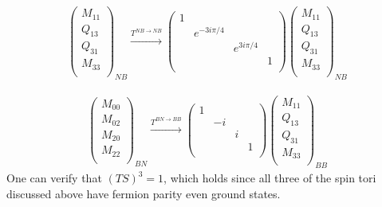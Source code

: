 \documentclass[12pt,a4paper]{article}
\newcounter{arrow}
\begin{document}
\begin{align}
\left( \begin{matrix}
M_{11}\\
Q_{13}\\
Q_{31}\\
M_{33}\\
\end{matrix} \right)_{NB}
\xrightarrow{T^{NB \rightarrow NB}}
 \left( \begin{matrix}
 1&&&\\
&e^{-3 i \pi /4}&&\\
&&e^{3 i \pi /4}&\\
&&&1\\
\end{matrix} \right)
\left( \begin{matrix}
M_{11}\\
Q_{13}\\
Q_{31}\\
M_{33}\\
\end{matrix} \right)_{NB}
\end{align}

\begin{align}
\left( \begin{matrix}
M_{00}\\
M_{02}\\
M_{20}\\
M_{22}\\
\end{matrix} \right)_{BN}
\xrightarrow{T^{BN \rightarrow BB}}
\left( \begin{matrix}
1&&&\\
&-i&&\\
&&i&\\
&&&1\\
\end{matrix} \right)
\left( \begin{matrix}
M_{11}\\
Q_{13}\\
Q_{31}\\
M_{33}\\
\end{matrix} \right)_{BB}
\end{align}
One can verify that $(TS)^3 = 1$, which holds since all three of the spin tori discussed above have fermion parity even ground states. 
\end{document}
